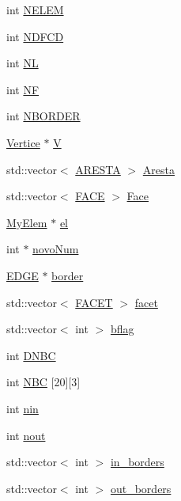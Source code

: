 \begin{DoxyCompactItemize}
int \hyperlink{classGeProb_ac5a0f21b0737394d783b9ca32317ece8}{N\+E\+L\+EM}
\item 
int \hyperlink{classGeProb_a2894b14d50728f945721f2c85e1fba4d}{N\+D\+F\+CD}
\item 
int \hyperlink{classGeProb_a4608e6b80b16c86a7bd7451adebc6f69}{NL}
\item 
int \hyperlink{classGeProb_a4168b4f9002df61cb396728b9eecbdca}{NF}
\item 
int \hyperlink{classGeProb_a7ff7ce9c7e12c1bb099c41b7fdc91d7d}{N\+B\+O\+R\+D\+ER}
\item 
\hyperlink{structVertice}{Vertice} $\ast$ \hyperlink{classGeProb_aaa26398869b601604a4a5f3032c46070}{V}
\item 
std\+::vector$<$ \hyperlink{structARESTA}{A\+R\+E\+S\+TA} $>$ \hyperlink{classGeProb_af82bffefd5e8fe33dec7ef5b8098a9b4}{Aresta}
\item 
std\+::vector$<$ \hyperlink{structFACE}{F\+A\+CE} $>$ \hyperlink{classGeProb_af050a3c4e639bd19028c49877aa10583}{Face}
\item 
\hyperlink{DG__Prob_8h_a83cd887ced9a6587428f267e50cd4787}{My\+Elem} $\ast$ \hyperlink{classGeProb_ac32127758c84295eb361466cf37afcac}{el}
\item 
int $\ast$ \hyperlink{classGeProb_ab8ee4f31d624e14988e65a7cd5c6a457}{novo\+Num}
\item 
\hyperlink{structEDGE}{E\+D\+GE} $\ast$ \hyperlink{classGeProb_a6c144ac05b601c5d6141c711edaaa775}{border}
\item 
std\+::vector$<$ \hyperlink{structFACET}{F\+A\+C\+ET} $>$ \hyperlink{classGeProb_a876f8c65be4b17f3c2b7b4b0605f34c1}{facet}
\item 
std\+::vector$<$ int $>$ \hyperlink{classGeProb_a60d3ba92d41a0776cdb3869e9bfeff7e}{bflag}
\item 
int \hyperlink{classGeProb_a416b1ac091d91a8959a4ff2518948466}{D\+N\+BC}
\item 
int \hyperlink{classGeProb_a5fb604ebcc5130a7ad4719d5f6578cb9}{N\+BC} \mbox{[}20\mbox{]}\mbox{[}3\mbox{]}
\item 
int \hyperlink{classGeProb_a2434630926ff59b81f12420354f533a7}{nin}
\item 
int \hyperlink{classGeProb_ae6ee447645542bcb3addd78e9896f546}{nout}
\item 
std\+::vector$<$ int $>$ \hyperlink{classGeProb_a9615df97c98b9b37d98f8548fad48439}{in\+\_\+borders}
\item 
std\+::vector$<$ int $>$ \hyperlink{classGeProb_a2ac12ca16e62807fd3c69d97bf665336}{out\+\_\+borders}

\end{DoxyCompactItemize}
